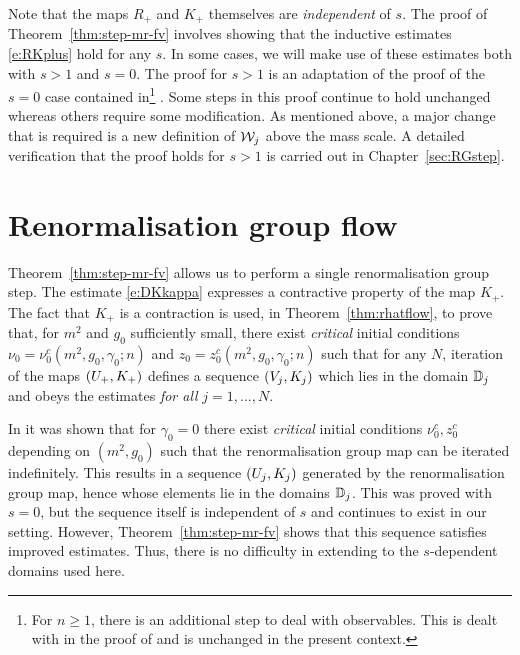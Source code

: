 Note that the maps $R_+$ and $K_+$ themselves are \emph{independent} of $s$.
The proof of Theorem~\ref{thm:step-mr-fv} involves showing that the
inductive estimates \eqref{e:RKplus} hold for any $s$. In some cases,
we will make use of these estimates both with $s > 1$ and $s = 0$.
The proof for $s > 1$ is an adaptation of the proof of the $s = 0$ case contained
in\footnote{For $n \ge 1$, there is an additional step to deal with observables.
This is dealt with in the proof of \cite[Theorem~\ref{phi4-thm:step-mr-fv}]{ST-phi4}
and is unchanged in the present context.}
\cite{BS-rg-IE,BS-rg-step}.
Some steps in this proof continue to hold unchanged whereas others require
some modification. As mentioned above, a major change that is required is
a new definition of $\mathcal{W}_j$ above the mass scale. A detailed verification
that the proof holds for $s > 1$ is carried out in Chapter~\ref{sec:RGstep}.


\section{Renormalisation group flow}

Theorem~\ref{thm:step-mr-fv} allows us to perform a single renormalisation group
step. The estimate \eqref{e:DKkappa} expresses a contractive property of the map
$K_+$. The fact that $K_+$ is a contraction is used, in Theorem~\ref{thm:rhatflow},
to prove that, for $m^2$ and $g_0$ sufficiently small, there exist
\emph{critical} initial conditions
$\nu_0 = \nu_0^c(m^2, g_0, \gamma_0; n)$ and $z_0 = z_0^c(m^2, g_0,\gamma_0; n)$
such that for any $N$,
iteration of the maps $(U_+,K_+)$ defines a sequence $(V_j, K_j)$
which lies in the domain $\mathbb{D}_j$ and obeys the estimates 
\emph{for all} $j = 1, \ldots, N$.

In \cite[Proposition~\ref{log-prop:flow-flow}]{BBS-saw4-log} it was shown
that for $\gamma_0 = 0$ there exist \emph{critical} initial conditions
$\nu_0^c, z_0^c$ depending on $(m^2, g_0)$ such that the renormalisation group
map can be iterated indefinitely. This
results in a sequence $(U_j, K_j)$ generated by the renormalisation group map, hence
whose elements lie in the domains $\mathbb{D}_j$. This was proved with $s = 0$,
but the sequence itself is independent of $s$ and continues to exist in our
setting. However, Theorem~\ref{thm:step-mr-fv} shows that this sequence satisfies
improved estimates. Thus, there is no difficulty in extending
\cite[Proposition~\ref{log-prop:flow-flow}]{BBS-saw4-log} to the $s$-dependent
domains used here.

